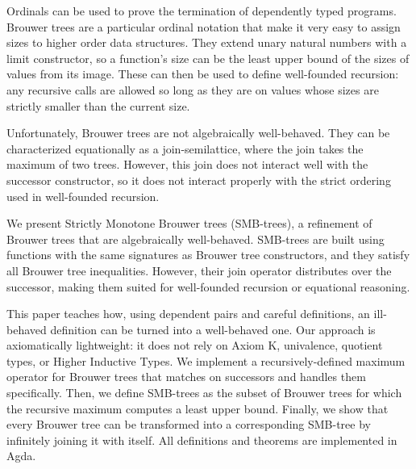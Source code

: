 
Ordinals can be used to prove the termination of dependently typed programs.
Brouwer trees are a particular ordinal notation that
make it very easy to assign sizes to higher order data structures.
They extend unary natural numbers with a limit constructor,
so a function's size can be the least upper bound of the sizes of values from its image.
These can then be used to define well-founded recursion: any recursive calls are allowed
so long as they are on values whose sizes are strictly smaller than the current size.

Unfortunately, Brouwer trees are not algebraically well-behaved.
They can be characterized equationally as a join-semilattice, where the join takes the maximum
of two trees. However, this join does not interact well with
the successor constructor, so it does not interact properly with
the strict ordering used in well-founded recursion.

We present Strictly Monotone Brouwer trees (SMB-trees), a refinement of Brouwer trees
that are algebraically well-behaved. SMB-trees are built using functions with the same
signatures as Brouwer tree constructors, and they satisfy all Brouwer tree inequalities.
However,  their join operator distributes over the successor, making them
suited for well-founded recursion or equational reasoning.

This paper teaches how, using dependent pairs and careful definitions, an ill-behaved
definition can be turned into a well-behaved one.
Our approach is axiomatically lightweight:
it does not rely on Axiom K, univalence, quotient types, or Higher Inductive Types.
We implement a recursively-defined maximum operator for Brouwer trees that matches
on successors and handles them specifically.
Then, we define SMB-trees as the subset of Brouwer trees for which the recursive maximum
computes a least upper bound.
Finally, we show that every Brouwer tree can be transformed into a corresponding SMB-tree
by infinitely joining it with itself.
All definitions and theorems are implemented in Agda.
